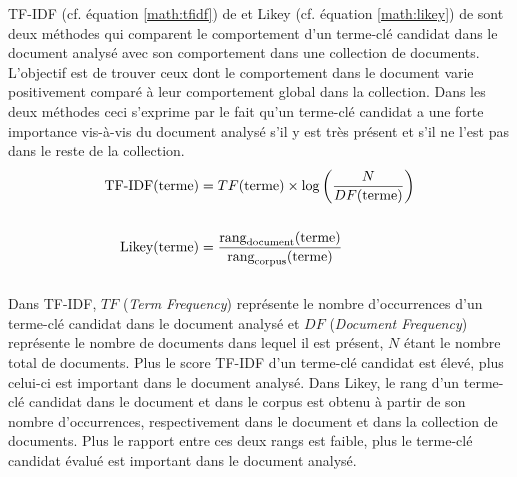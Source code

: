         TF-IDF (cf. équation \ref{math:tfidf}) de  et
        Likey (cf. équation \ref{math:likey}) de 
        sont deux méthodes qui comparent le comportement d'un terme-clé
        candidat dans le document analysé avec son comportement dans une
        collection de documents. L'objectif est de trouver ceux dont le
        comportement dans le document varie positivement comparé à leur
        comportement global dans la collection. Dans les deux méthodes ceci
        s'exprime par le fait qu'un terme-clé candidat a une forte importance
        vis-à-vis du document analysé s'il y est très présent et s'il ne l'est
        pas dans le reste de la collection.
        \begin{align}
          \text{TF-IDF}(\text{terme}) &= TF(\text{terme}) \times \log\left(\frac{N}{DF(\text{terme})}\right) \label{math:tfidf}\\
          \notag\\
          \text{Likey}(\text{terme}) &= \frac{\text{rang}_{\text{document}}(\text{terme})}{\text{rang}_{\text{corpus}}(\text{terme})} \label{math:likey}
        \end{align}\\
        Dans TF-IDF, $TF$ (\textit{Term Frequency}) représente le nombre
        d'occurrences d'un terme-clé candidat dans le document analysé et $DF$
        (\textit{Document Frequency}) représente le nombre de documents dans
        lequel il est présent, $N$ étant le nombre total de documents. Plus le
        score TF-IDF d'un terme-clé candidat est élevé, plus celui-ci est
        important dans le document analysé. Dans Likey, le rang d'un terme-clé
        candidat dans le document et dans le corpus est obtenu à partir de son
        nombre d'occurrences, respectivement dans le document et dans la
        collection de documents. Plus le rapport entre ces deux rangs est
        faible, plus le terme-clé candidat évalué est important dans le
        document analysé.

